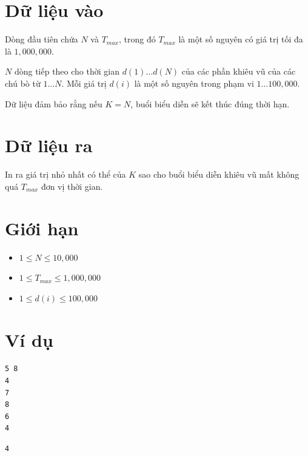 \documentclass[12pt,a4paper]{article}
\begin{document}
\section*{Dữ liệu vào}
Dòng đầu tiên chứa $N$ và $T_{max}$, trong đó $T_{max}$ là một số nguyên có giá trị tối đa là $1,000,000$.

$N$ dòng tiếp theo cho thời gian $d(1) \dots d(N)$ của các phần khiêu vũ của các chú bò từ $1 \dots N$. Mỗi giá trị $d(i)$ là một số nguyên trong phạm vi $1 \dots 100,000$.

Dữ liệu đảm bảo rằng nếu $K=N$, buổi biểu diễn sẽ kết thúc đúng thời hạn.

\section*{Dữ liệu ra}
In ra giá trị nhỏ nhất có thể của $K$ sao cho buổi biểu diễn khiêu vũ mất không quá $T_{max}$ đơn vị thời gian.

\section*{Giới hạn}
\begin{constraintbox}
\begin{itemize}
    \item $1 \le N \le 10,000$
    \item $1 \le T_{max} \le 1,000,000$
    \item $1 \le d(i) \le 100,000$
\end{itemize}
\end{constraintbox}

\section*{Ví dụ}
\noindent
\begin{minipage}[t]{0.48\textwidth}
\begin{inputbox}
\begin{lstlisting}
5 8
4
7
8
6
4
\end{lstlisting}
\end{inputbox}
\end{minipage}\hfill
\begin{minipage}[t]{0.48\textwidth}
\begin{outputbox}
\begin{lstlisting}
4
\end{lstlisting}
\end{outputbox}
\end{minipage}
\end{document}
